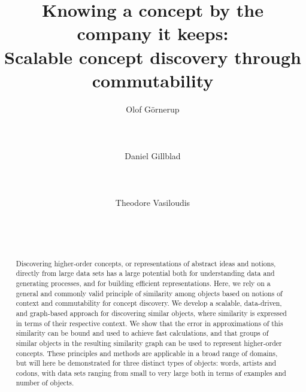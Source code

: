 \documentclass{sig-alternate}
\begin{document}
\title{Knowing a concept by the company it keeps:\\Scalable concept discovery through commutability}

\author{
\alignauthor
Olof G\"{o}rnerup\\ %
       \\
       \\
       \\
\alignauthor
Daniel Gillblad\\ %
       \\
       \\
       \\
\alignauthor
Theodore Vasiloudis\\ %
       \\
       \\
       \\
}

\maketitle
\begin{abstract}
\begin{sloppypar}
Discovering higher-order concepts, or representations of abstract ideas and notions, directly from large data sets has
a large potential both for understanding data and generating processes, and for building efficient representations. Here, we
rely on a general and commonly valid principle of similarity among objects based on notions of context and
commutability for concept discovery. We develop a scalable, data-driven, and graph-based approach for discovering
similar objects, where similarity is expressed in terms of their respective context. We show that the
error in approximations of this similarity can be bound and used to achieve fast calculations, and that groups of
similar objects in the resulting similarity graph can be used to represent higher-order concepts. These principles and
methods are applicable in a broad range of domains, but will here be demonstrated for three distinct types of objects:
words, artists and codons, with data sets ranging from small to very large both in terms of examples and number
of objects.
\end{sloppypar}
\end{abstract}
\end{document}
